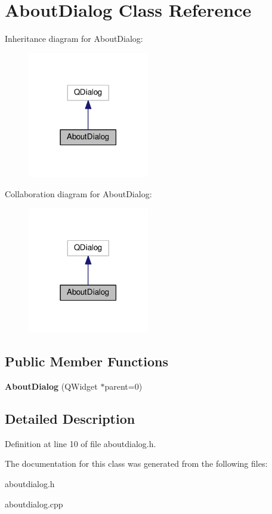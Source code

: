 \hypertarget{class_about_dialog}{}\section{About\+Dialog Class Reference}
\label{class_about_dialog}


Inheritance diagram for About\+Dialog\+:\nopagebreak
\begin{figure}[H]
\begin{center}
\leavevmode
\includegraphics[width=150pt]{class_about_dialog__inherit__graph}
\end{center}
\end{figure}


Collaboration diagram for About\+Dialog\+:\nopagebreak
\begin{figure}[H]
\begin{center}
\leavevmode
\includegraphics[width=150pt]{class_about_dialog__coll__graph}
\end{center}
\end{figure}
\subsection*{Public Member Functions}
\begin{DoxyCompactItemize}
\item 
\mbox{\label{class_about_dialog_ad96fc2ce8de7568ace543b7c69c71c56}} 
{\bfseries About\+Dialog} (Q\+Widget $\ast$parent=0)
\end{DoxyCompactItemize}


\subsection{Detailed Description}


Definition at line 10 of file aboutdialog.\+h.



The documentation for this class was generated from the following files\+:\begin{DoxyCompactItemize}
\item 
aboutdialog.\+h\item 
aboutdialog.\+cpp\end{DoxyCompactItemize}
